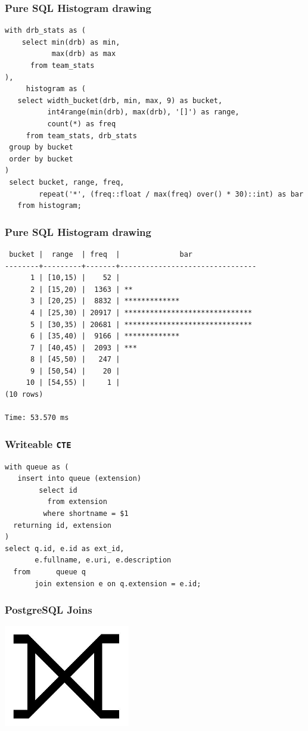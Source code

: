 \documentclass{beamer}
\begin{document}
\begin{frame}[fragile]
  \frametitle{Pure SQL Histogram drawing}
  
  \begin{verbatim}
with drb_stats as (
    select min(drb) as min,
           max(drb) as max
      from team_stats
),
     histogram as (
   select width_bucket(drb, min, max, 9) as bucket,
          int4range(min(drb), max(drb), '[]') as range,
          count(*) as freq
     from team_stats, drb_stats
 group by bucket
 order by bucket
)
 select bucket, range, freq,
        repeat('*', (freq::float / max(freq) over() * 30)::int) as bar
   from histogram;
  \end{verbatim}
\end{frame}

\begin{frame}[fragile]
  \frametitle{Pure SQL Histogram drawing}
  
  \begin{verbatim}
 bucket |  range  | freq  |              bar               
--------+---------+-------+--------------------------------
      1 | [10,15) |    52 | 
      2 | [15,20) |  1363 | **
      3 | [20,25) |  8832 | *************
      4 | [25,30) | 20917 | ******************************
      5 | [30,35) | 20681 | ******************************
      6 | [35,40) |  9166 | *************
      7 | [40,45) |  2093 | ***
      8 | [45,50) |   247 | 
      9 | [50,54) |    20 | 
     10 | [54,55) |     1 | 
(10 rows)

Time: 53.570 ms
\end{verbatim}
\end{frame}

\begin{frame}[fragile]
  \frametitle{Writeable \texttt{CTE}}
  
  \begin{verbatim}
with queue as (
   insert into queue (extension)
        select id
          from extension
         where shortname = $1
  returning id, extension
)
select q.id, e.id as ext_id,
       e.fullname, e.uri, e.description
  from      queue q
       join extension e on q.extension = e.id;    
  \end{verbatim}
\end{frame}

\begin{frame}
  \frametitle{PostgreSQL Joins}

  \begin{center}
    \includegraphics[height=12em]{huge-full-outer-join.jpg}
  \end{center}
\end{frame}
\end{document}

